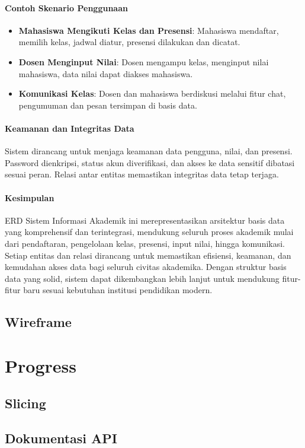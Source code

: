 \documentclass[a4paper,oneside,11pt]{book}
\begin{document}
\subsubsection{Contoh Skenario Penggunaan}
\begin{itemize}
  \item \textbf{Mahasiswa Mengikuti Kelas dan Presensi}: Mahasiswa mendaftar, memilih kelas, jadwal diatur, presensi dilakukan dan dicatat.
  \item \textbf{Dosen Menginput Nilai}: Dosen mengampu kelas, menginput nilai mahasiswa, data nilai dapat diakses mahasiswa.
  \item \textbf{Komunikasi Kelas}: Dosen dan mahasiswa berdiskusi melalui fitur chat, pengumuman dan pesan tersimpan di basis data.
\end{itemize}

\subsubsection{Keamanan dan Integritas Data}
\par Sistem dirancang untuk menjaga keamanan data pengguna, nilai, dan presensi. Password dienkripsi, status akun diverifikasi, dan akses ke data sensitif dibatasi sesuai peran. Relasi antar entitas memastikan integritas data tetap terjaga.

\subsubsection{Kesimpulan}
\par ERD Sistem Informasi Akademik ini merepresentasikan arsitektur basis data yang komprehensif dan terintegrasi, mendukung seluruh proses akademik mulai dari pendaftaran, pengelolaan kelas, presensi, input nilai, hingga komunikasi. Setiap entitas dan relasi dirancang untuk memastikan efisiensi, keamanan, dan kemudahan akses data bagi seluruh civitas akademika. Dengan struktur basis data yang solid, sistem dapat dikembangkan lebih lanjut untuk mendukung fitur-fitur baru sesuai kebutuhan institusi pendidikan modern.
\section{Wireframe}

\chapter{Progress}
\section{Slicing}
\section{Dokumentasi API}
\end{document}
